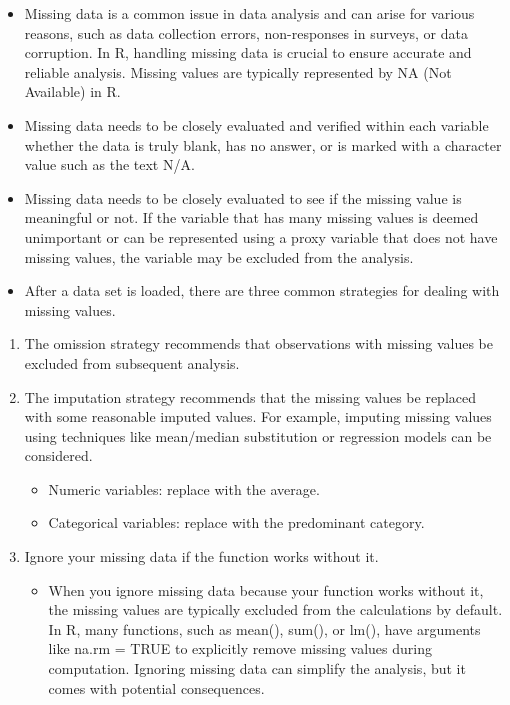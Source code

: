 \documentclass[
  letterpaper,
  DIV=11,
  numbers=noendperiod]{scrreprt}
\providecommand{\tightlist}{%
  \setlength{\itemsep}{0pt}\setlength{\parskip}{0pt}}\usepackage{longtable,booktabs,array}
\begin{document}
\begin{itemize}
\item
  Missing data is a common issue in data analysis and can arise for
  various reasons, such as data collection errors, non-responses in
  surveys, or data corruption. In R, handling missing data is crucial to
  ensure accurate and reliable analysis. Missing values are typically
  represented by NA (Not Available) in R.
\item
  Missing data needs to be closely evaluated and verified within each
  variable whether the data is truly blank, has no answer, or is marked
  with a character value such as the text N/A.
\item
  Missing data needs to be closely evaluated to see if the missing value
  is meaningful or not. If the variable that has many missing values is
  deemed unimportant or can be represented using a proxy variable that
  does not have missing values, the variable may be excluded from the
  analysis.
\item
  After a data set is loaded, there are three common strategies for
  dealing with missing values.
\end{itemize}

\begin{enumerate}
\def\labelenumi{\arabic{enumi}.}
\item
  The omission strategy recommends that observations with missing values
  be excluded from subsequent analysis.
\item
  The imputation strategy recommends that the missing values be replaced
  with some reasonable imputed values. For example, imputing missing
  values using techniques like mean/median substitution or regression
  models can be considered.

  \begin{itemize}
  \tightlist
  \item
    Numeric variables: replace with the average.
  \item
    Categorical variables: replace with the predominant category.
  \end{itemize}
\item
  Ignore your missing data if the function works without it.

  \begin{itemize}
  \tightlist
  \item
    When you ignore missing data because your function works without it,
    the missing values are typically excluded from the calculations by
    default. In R, many functions, such as mean(), sum(), or lm(), have
    arguments like na.rm = TRUE to explicitly remove missing values
    during computation. Ignoring missing data can simplify the analysis,
    but it comes with potential consequences.
  \end{itemize}
\end{enumerate}
\end{document}
